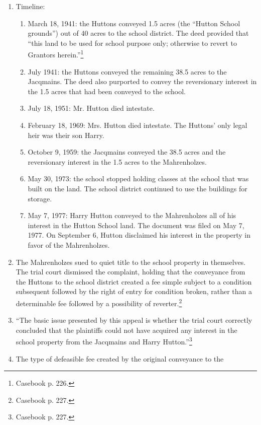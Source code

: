 \begin{enumerate}
    \item Timeline:
    \begin{enumerate}
        \item March 18, 1941: the Huttons conveyed 1.5 acres (the ``Hutton 
        School grounds'') out of 40 acres to the school district. The deed 
        provided that ``this land to be used for school purpose only; 
        otherwise to revert to Grantors herein.''\footnote{Casebook p. 226.}
        \item July 1941: the Huttons conveyed the remaining 38.5 acres to the 
        Jacqmains. The deed also purported to convey the reversionary 
        interest in the 1.5 acres that had been conveyed to the school.
        \item July 18, 1951: Mr. Hutton died intestate.
        \item February 18, 1969: Mrs. Hutton died intestate. The Huttons' only 
        legal heir was their son Harry.
        \item October 9, 1959: the Jacqmains conveyed the 38.5 acres and the 
        reversionary interest in the 1.5 acres to the Mahrenholzes.
        \item May 30, 1973: the school stopped holding classes at the school 
        that was built on the land. The school district continued to use the 
        buildings for storage.
        \item May 7, 1977: Harry Hutton conveyed to the Mahrenholzes all of 
        his interest in the Hutton School land. The document was filed on May 
        7, 1977. On September 6, Hutton disclaimed his interest in the 
        property in favor of the Mahrenholzes.
    \end{enumerate}
    \item The Mahrenholzes sued to quiet title to the school property in 
    themselves. The trial court dismissed the complaint, holding that the 
    conveyance from the Huttons to the school district created a fee simple 
    subject to a condition subsequent followed by the right of entry for 
    condition broken, rather than a determinable fee followed by a possibility 
    of reverter.\footnote{Casebook p. 227.}
    \item ``The basic issue presented by this appeal is whether the trial 
    court correctly concluded that the plaintiffs could not have acquired any 
    interest in the school property from the Jacqmains and Harry 
    Hutton.''\footnote{Casebook p. 227.}
    \item The type of defeasible fee created by the original conveyance to the 

\end{enumerate}
